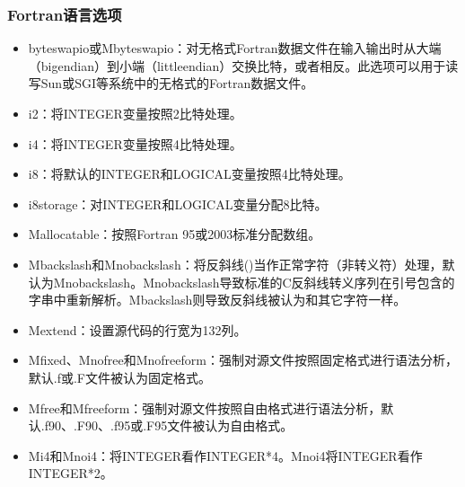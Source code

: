 \documentclass[a4paper,12pt,english]{sphinxmanual}
\begin{document}
\subsubsection{Fortran语言选项}
\label{\detokenize{compiler/pgi:id11}}\label{\detokenize{compiler/pgi:id12}}\begin{itemize}
\item {} 
\sphinxAtStartPar
\sphinxhyphen{}byteswapio或\sphinxhyphen{}Mbyteswapio：对无格式Fortran数据文件在输入输出时从大端（big\sphinxhyphen{}endian）到小端（little\sphinxhyphen{}endian）交换比特，或者相反。此选项可以用于读写Sun或SGI等系统中的无格式的Fortran数据文件。

\item {} 
\sphinxAtStartPar
\sphinxhyphen{}i2：将INTEGER变量按照2比特处理。

\item {} 
\sphinxAtStartPar
\sphinxhyphen{}i4：将INTEGER变量按照4比特处理。

\item {} 
\sphinxAtStartPar
\sphinxhyphen{}i8：将默认的INTEGER和LOGICAL变量按照4比特处理。

\item {} 
\sphinxAtStartPar
\sphinxhyphen{}i8storage：对INTEGER和LOGICAL变量分配8比特。

\item {} 
\sphinxAtStartPar
\sphinxhyphen{}Mallocatable\sphinxstyleemphasis{{[}=95|03{]}}：按照Fortran 95或2003标准分配数组。

\item {} 
\sphinxAtStartPar
\sphinxhyphen{}Mbackslash和\sphinxhyphen{}Mnobackslash：将反斜线()当作正常字符（非转义符）处理，默认为\sphinxhyphen{}Mnobackslash。\sphinxhyphen{}Mnobackslash导致标准的C反斜线转义序列在引号包含的字串中重新解析。\sphinxhyphen{}Mbackslash则导致反斜线被认为和其它字符一样。

\item {} 
\sphinxAtStartPar
\sphinxhyphen{}Mextend：设置源代码的行宽为132列。

\item {} 
\sphinxAtStartPar
\sphinxhyphen{}Mfixed、\sphinxhyphen{}Mnofree和\sphinxhyphen{}Mnofreeform：强制对源文件按照固定格式进行语法分析，默认.f或.F文件被认为固定格式。

\item {} 
\sphinxAtStartPar
\sphinxhyphen{}Mfree和\sphinxhyphen{}Mfreeform：强制对源文件按照自由格式进行语法分析，默认.f90、.F90、.f95或.F95文件被认为自由格式。

\item {} 
\sphinxAtStartPar
\sphinxhyphen{}Mi4和\sphinxhyphen{}Mnoi4：将INTEGER看作INTEGER*4。\sphinxhyphen{}Mnoi4将INTEGER看作INTEGER*2。


\end{itemize}
\end{document}
